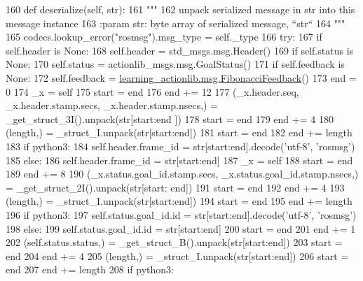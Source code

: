 \begin{DoxyCode}
160   \textcolor{keyword}{def }deserialize(self, str):
161     \textcolor{stringliteral}{"""}
162 \textcolor{stringliteral}{    unpack serialized message in str into this message instance}
163 \textcolor{stringliteral}{    :param str: byte array of serialized message, ``str``}
164 \textcolor{stringliteral}{    """}
165     codecs.lookup\_error(\textcolor{stringliteral}{"rosmsg"}).msg\_type = self.\_type
166     \textcolor{keywordflow}{try}:
167       \textcolor{keywordflow}{if} self.header \textcolor{keywordflow}{is} \textcolor{keywordtype}{None}:
168         self.header = std\_msgs.msg.Header()
169       \textcolor{keywordflow}{if} self.status \textcolor{keywordflow}{is} \textcolor{keywordtype}{None}:
170         self.status = actionlib\_msgs.msg.GoalStatus()
171       \textcolor{keywordflow}{if} self.feedback \textcolor{keywordflow}{is} \textcolor{keywordtype}{None}:
172         self.feedback = \hyperlink{classlearning__actionlib_1_1msg_1_1__FibonacciFeedback_1_1FibonacciFeedback}{learning\_actionlib.msg.FibonacciFeedback}()
173       end = 0
174       \_x = self
175       start = end
176       end += 12
177       (\_x.header.seq, \_x.header.stamp.secs, \_x.header.stamp.nsecs,) = \_get\_struct\_3I().unpack(str[start:end
      ])
178       start = end
179       end += 4
180       (length,) = \_struct\_I.unpack(str[start:end])
181       start = end
182       end += length
183       \textcolor{keywordflow}{if} python3:
184         self.header.frame\_id = str[start:end].decode(\textcolor{stringliteral}{'utf-8'}, \textcolor{stringliteral}{'rosmsg'})
185       \textcolor{keywordflow}{else}:
186         self.header.frame\_id = str[start:end]
187       \_x = self
188       start = end
189       end += 8
190       (\_x.status.goal\_id.stamp.secs, \_x.status.goal\_id.stamp.nsecs,) = \_get\_struct\_2I().unpack(str[start:
      end])
191       start = end
192       end += 4
193       (length,) = \_struct\_I.unpack(str[start:end])
194       start = end
195       end += length
196       \textcolor{keywordflow}{if} python3:
197         self.status.goal\_id.id = str[start:end].decode(\textcolor{stringliteral}{'utf-8'}, \textcolor{stringliteral}{'rosmsg'})
198       \textcolor{keywordflow}{else}:
199         self.status.goal\_id.id = str[start:end]
200       start = end
201       end += 1
202       (self.status.status,) = \_get\_struct\_B().unpack(str[start:end])
203       start = end
204       end += 4
205       (length,) = \_struct\_I.unpack(str[start:end])
206       start = end
207       end += length
208       \textcolor{keywordflow}{if} python3:

\end{DoxyCode}
